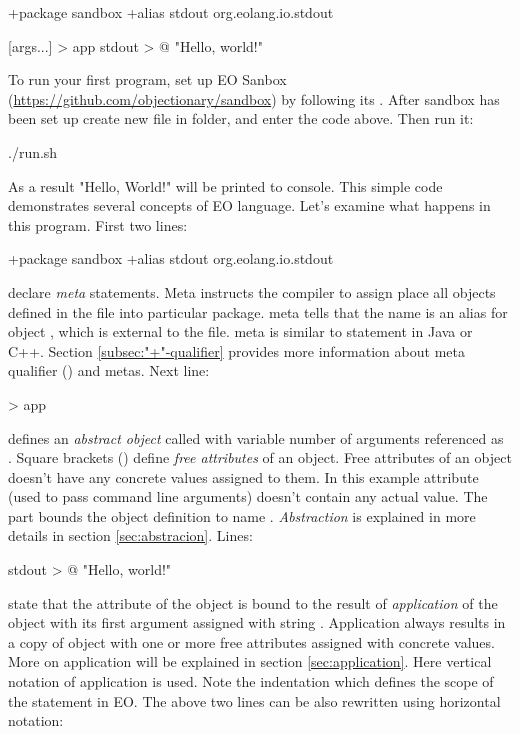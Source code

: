 \documentclass[12pt]{book}
\begin{document}
\begin{ffcode}
+package sandbox
+alias stdout org.eolang.io.stdout

[args...] > app
  stdout > @
    "Hello, world!\n"
    
\end{ffcode}

To run your first program, set up EO Sanbox (\url{https://github.com/objectionary/sandbox}) by following its . After sandbox has been set up create new file  in  folder, and enter the code above. Then run it:

\begin{ffcode}
./run.sh
\end{ffcode}

As a result "Hello, World!" will be printed to console. This simple code demonstrates several concepts of EO language. Let’s examine what happens in this program. First two lines:
\begin{ffcode}
+package sandbox
+alias stdout org.eolang.io.stdout
\end{ffcode}
declare \textit{meta} statements. Meta  instructs the compiler to assign place all objects defined in the file into particular package.  meta tells that the name  is an alias for object , which is external to the file.  meta is similar to  statement in Java or C++. Section \ref{subsec:"+"-qualifier} provides more information about meta qualifier (\ff{+}) and metas. Next line: 
\begin{ffcode}
[args...] > app
\end{ffcode}
defines an \textit{abstract object} called  with variable number of arguments referenced as . Square brackets (\ff{[]}) define \textit{free attributes} of an object. Free attributes of an object doesn't have any concrete values assigned to them. In this example attribute  (used to pass command line arguments) doesn't contain any actual value. The  part bounds the object definition to name . \textit{Abstraction} is explained in more details in section \ref{sec:abstracion}. Lines:
\begin{ffcode}
stdout > @
  "Hello, world!\n"
\end{ffcode}
state that the attribute  of the object is bound to the result of \textit{application} of the object  with its first argument assigned with string . Application always results in a copy of object with one or more free attributes assigned with concrete values. More on application will be explained in section \ref{sec:application}. Here vertical notation of application is used. Note the indentation which defines the scope of the statement in EO. The above two lines can be also rewritten using horizontal notation:
\end{document}
